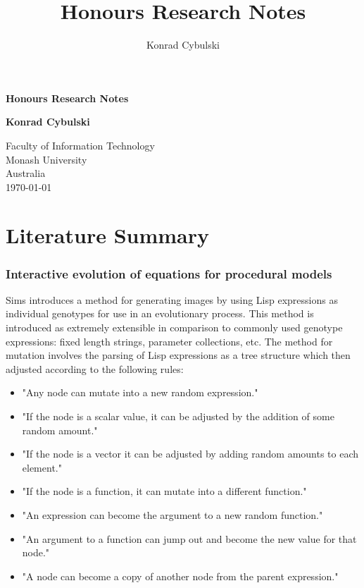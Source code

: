 \documentclass[10pt,a4paper]{article}
\author{Konrad Cybulski}
\title{Honours Research Notes}
\begin{document}
	
	\begin{titlepage}
		\begin{center}
			\vspace*{1cm}
			
			\LARGE
			\textbf{Honours Research Notes}
			
			\vspace{2cm}
			\Large
			
			\textbf{Konrad Cybulski}
			
			\vfill
			
			\vspace{0.8cm}
			
			\large
			Faculty of Information Technology\\
			Monash University\\
			Australia\\
			\today
			
		\end{center}
	\end{titlepage}
	
	\pagebreak
	\tableofcontents
	\pagebreak
	
	\section{Literature Summary}
	
	\subsubsection{Interactive evolution of equations for procedural models \citep{sims}}
	
	Sims introduces a method for generating images by using Lisp expressions as individual genotypes for use in an evolutionary process.
	This method is introduced as extremely extensible in comparison to commonly used genotype expressions: fixed length strings, parameter collections, etc.
	The method for mutation involves the parsing of Lisp expressions as a tree structure which then adjusted according to the following rules:
	
	\begin{itemize}
		\item "Any node can mutate into a new random expression."
		\item "If the node is a scalar value, it can be adjusted by the addition of some random amount."
		\item "If the node is a vector it can be adjusted by adding random amounts to each element."
		\item "If the node is a function, it can mutate into a different function."
		\item "An expression can become the argument to a new random function."
		\item "An argument to a function can jump out and become the new value for that node."
		\item "A node can become a copy of another node from the parent expression."
	\end{itemize}
	
\end{document}

